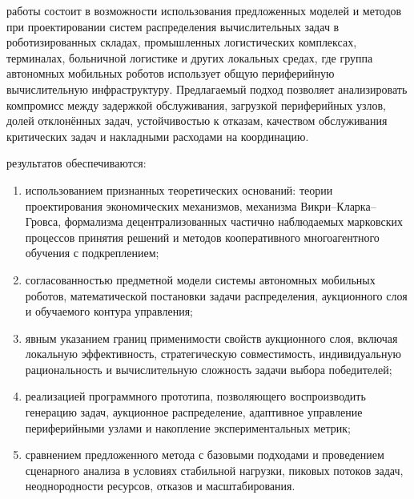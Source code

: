 \influence работы состоит в возможности использования предложенных моделей и методов при проектировании систем распределения вычислительных задач в роботизированных складах, промышленных логистических комплексах, терминалах, больничной логистике и других локальных средах, где группа автономных мобильных роботов использует общую периферийную вычислительную инфраструктуру.
Предлагаемый подход позволяет анализировать компромисс между задержкой обслуживания, загрузкой периферийных узлов, долей отклонённых задач, устойчивостью к отказам, качеством обслуживания критических задач и накладными расходами на координацию.

\reliability результатов обеспечиваются:
\begin{enumerate}
    \item использованием признанных теоретических оснований: теории проектирования экономических механизмов, механизма Викри--Кларка--Гровса, формализма децентрализованных частично наблюдаемых марковских процессов принятия решений и методов кооперативного многоагентного обучения с подкреплением;
	\item согласованностью предметной модели системы автономных мобильных роботов, математической постановки задачи распределения, аукционного слоя и обучаемого контура управления;
	\item явным указанием границ применимости свойств аукционного слоя, включая локальную эффективность, стратегическую совместимость, индивидуальную рациональность и вычислительную сложность задачи выбора победителей;
	\item реализацией программного прототипа, позволяющего воспроизводить генерацию задач, аукционное распределение, адаптивное управление периферийными узлами и накопление экспериментальных метрик;
	\item сравнением предложенного метода с базовыми подходами и проведением сценарного анализа в условиях стабильной нагрузки, пиковых потоков задач, неоднородности ресурсов, отказов и масштабирования.
\end{enumerate}


